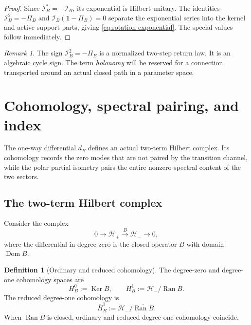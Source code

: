 \documentclass[11pt,reqno]{scrartcl}
\newcommand{\scrHp}{\mathscr H_{+}}
\newcommand{\scrHm}{\mathscr H_{-}}
\newcommand{\idop}{\mathbf 1}
\DeclareMathOperator{\Dom}{Dom}
\DeclareMathOperator{\Ran}{Ran}
\DeclareMathOperator{\Ker}{Ker}
\theoremstyle{plain}
\theoremstyle{definition}
\newtheorem{definition}[definition]{Definition}
\theoremstyle{remark}
\newtheorem{remark}[remark]{Remark}
\begin{document}
\begin{proof}
Since \(\mathcal I_B^*=-\mathcal I_B\), its exponential is Hilbert-unitary.
The identities \(\mathcal I_B^2=-\Pi_B\) and
\(\mathcal I_B(\idop-\Pi_B)=0\) separate the exponential series into the
kernel and active-support parts, giving \eqref{eq:rotation-exponential}.
The special values follow immediately.
\end{proof}

\begin{remark}
The sign \(\mathcal I_B^2=-\Pi_B\) is a normalized two-step return law.  It
is an algebraic cycle sign.  The term \emph{holonomy} will be reserved for a
connection transported around an actual closed path in a parameter space.
\end{remark}


\section{Cohomology, spectral pairing, and index}
\label{sec:cohomology}

The one-way differential \(d_B\) defines an actual two-term Hilbert complex.
Its cohomology records the zero modes that are not paired by the transition
channel, while the polar partial isometry pairs the entire nonzero spectral
content of the two sectors.

\subsection{The two-term Hilbert complex}

Consider the complex
\begin{equation}
  0\longrightarrow\scrHp
  \xrightarrow{\;B\;}
  \scrHm\longrightarrow0,
  \label{eq:two-term-complex}
\end{equation}
where the differential in degree zero is the closed operator \(B\) with
domain \(\Dom B\).

\begin{definition}[Ordinary and reduced cohomology]
\label{def:cohomology}
The degree-zero and degree-one cohomology spaces are
\begin{equation}
  H_B^0:=\Ker B,
  \qquad
  H_B^1:=\scrHm/\Ran B.
  \label{eq:ordinary-cohomology}
\end{equation}
The reduced degree-one cohomology is
\begin{equation}
  \overline H_B^1:=\scrHm/\overline{\Ran B}.
  \label{eq:reduced-cohomology}
\end{equation}
When \(\Ran B\) is closed, ordinary and reduced degree-one cohomology
coincide.
\end{definition}
\end{document}
